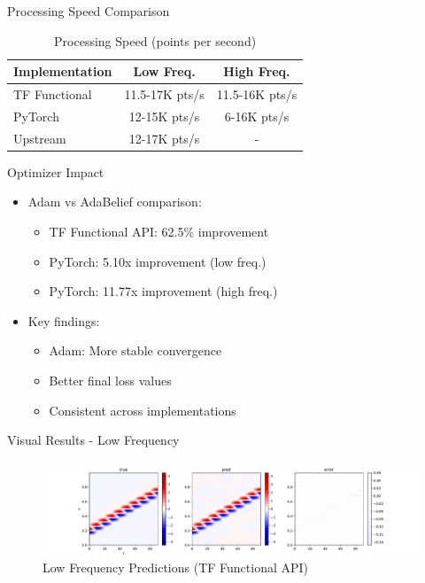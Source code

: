 \documentclass{beamer}
\begin{document}
\begin{frame}{Processing Speed Comparison}
    \begin{table}
        \centering
        \begin{tabular}{lcc}
            \hline
            \textbf{Implementation} & \textbf{Low Freq.} & \textbf{High Freq.} \\
            \hline
            TF Functional & 11.5-17K pts/s & 11.5-16K pts/s \\
            PyTorch & 12-15K pts/s & 6-16K pts/s \\
            Upstream & 12-17K pts/s & - \\
            \hline
        \end{tabular}
        \caption{Processing Speed (points per second)}
    \end{table}
\end{frame}

\begin{frame}{Optimizer Impact}
    \begin{itemize}
        \item Adam vs AdaBelief comparison:
        \begin{itemize}
            \item TF Functional API: 62.5\% improvement
            \item PyTorch: 5.10x improvement (low freq.)
            \item PyTorch: 11.77x improvement (high freq.)
        \end{itemize}
        \item Key findings:
        \begin{itemize}
            \item Adam: More stable convergence
            \item Better final loss values
            \item Consistent across implementations
        \end{itemize}
    \end{itemize}
\end{frame}

\begin{frame}{Visual Results - Low Frequency}
    \begin{figure}
        \includegraphics[width=\textwidth]{functional/low-frequency-adam-20250206-1105-1/vis}
        \caption{Low Frequency Predictions (TF Functional API)}
    \end{figure}
\end{frame}
\end{document}
